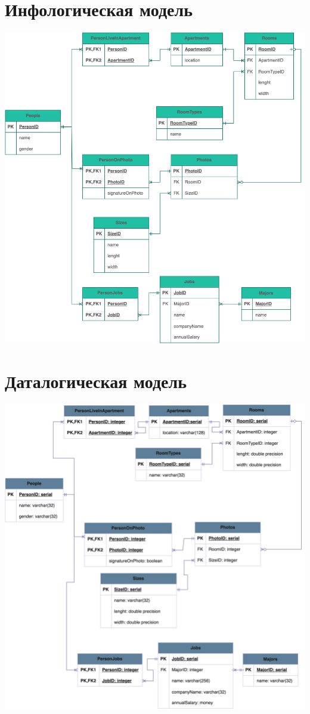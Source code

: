 \documentclass[12pt,onecolumn]{article}
\begin{document}
\section{Инфологическая модель}
\includegraphics[width=\textwidth]{image/Infological-model.png}
\section{Даталогическая модель}
\includegraphics[width=\textwidth]{image/datalogical-model.png}
\end{document}
